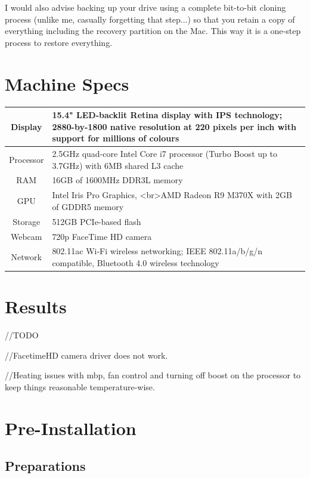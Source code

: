 I would also advise backing up your drive using a complete bit-to-bit cloning process (unlike me, casually forgetting that step...) so that you retain a copy of everything including the recovery partition on the Mac. This way it is a one-step process to restore everything.

\section{Machine Specs}

\begin{tabularx}{\textwidth}{|c|X|}
	\hline
	Display   & 15.4" LED-backlit Retina display with IPS technology; 2880-by-1800 native resolution at 220 pixels per inch with support for millions of colours \\\hline
	Processor & 2.5GHz quad-core Intel Core i7 processor (Turbo Boost up to 3.7GHz) with 6MB shared L3 cache \\\hline
	RAM       & 16GB of 1600MHz DDR3L memory \\\hline
	GPU       & Intel Iris Pro Graphics, <br>AMD Radeon R9 M370X with 2GB of GDDR5 memory \\\hline
	Storage   & 512GB PCIe-based flash \\\hline
	Webcam    & 720p FaceTime HD camera \\\hline
	Network   & 802.11ac Wi‑Fi wireless networking; IEEE 802.11a/b/g/n compatible, Bluetooth 4.0 wireless technology \\
	\hline
\end{tabularx}

\section{Results}

\raisebox{-0.2\height}{\color{green}{\openiconic[]}}
\raisebox{-0.2\height}{\color{red}{\openiconic[]}}

//TODO

//FacetimeHD camera driver does not work.

//Heating issues with mbp, fan control and turning off boost on the processor to keep things
reasonable temperature-wise.

\section{Pre-Installation}

\subsection{Preparations}

